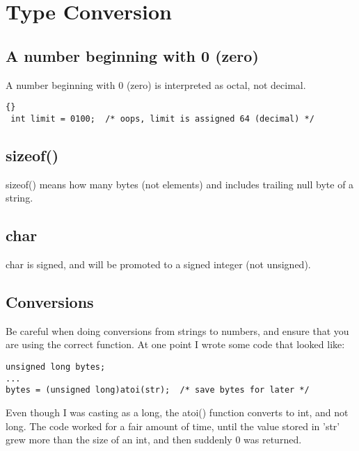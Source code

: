 \documentclass{report}
\begin{document}
\chapter{Type Conversion}


\section{A number beginning with 0 (zero)}
A number beginning with 0 (zero) is interpreted as octal, not decimal.
\begin{lstlisting}{}
 int limit = 0100;  /* oops, limit is assigned 64 (decimal) */
\end{lstlisting}

\section{sizeof()}
sizeof() means how many bytes (not elements) and includes trailing null byte of a string.

\section{char}
char is signed, and will be promoted to a signed integer (not unsigned).

\section{Conversions}
Be careful when doing conversions from strings to numbers, and ensure that you are using the correct function. At one point I wrote some code that looked like:
\begin{lstlisting}
unsigned long bytes;
...
bytes = (unsigned long)atoi(str);  /* save bytes for later */
\end{lstlisting}
Even though I was casting as a long, the atoi() function converts to int, and not long. The code worked for a fair amount of time, until the value stored in 'str' grew more than the size of an int, and then suddenly 0 was returned.
\end{document}
